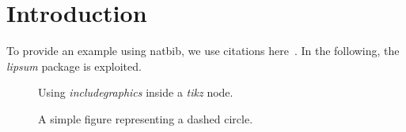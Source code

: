 \section{Introduction}
\label{sec:introduction}

To provide an example using natbib, we use citations here~\cite{Jackson,Moore}.
In the following, the \emph{lipsum} package is exploited.

\lipsum[5-9]

\begin{figure}
    \centering
    \caption{Using \emph{includegraphics} inside a \emph{tikz} node.}
 \label{fig:chip}
\end{figure}

\begin{figure}
    \centering
    
    \caption{A simple figure representing a dashed circle.}
    \label{fig:wireCrossSection}
\end{figure}

\lipsum[10]
